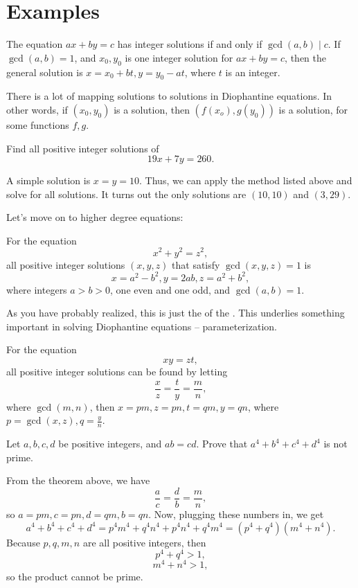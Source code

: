 \documentclass[mast]{lucky}
\begin{document}
\section{Examples}
\begin{theo} 
The equation $ax+by=c$ has integer solutions if and only if $\gcd(a,b) \mid c$. If $\gcd(a,b) = 1$, and $x_0,y_0$ is one integer solution for $ax+by=c$, then the general solution is $x=x_0+bt,y=y_0-at$, where $t$ is an integer.
\end{theo}
There is a lot of mapping solutions to solutions in Diophantine equations. In other words, if $(x_0,y_0)$ is a solution, then $(f(x_o),g(y_0))$ is a solution, for some functions $f,g$.
\begin{exam}
Find all positive integer solutions of
$$19x+7y=260.$$
\end{exam}
\begin{sol}
A simple solution is $x=y=10$. Thus, we can apply the method listed above and solve for all solutions. It turns out the only solutions are $(10,10)$ and $(3,29)$. 
\end{sol}
Let's move on to higher degree equations:
\begin{theo} 
For the equation
$$x^2+y^2=z^2,$$
all positive integer solutions $(x,y,z)$ that satisfy $\gcd(x,y,z)=1$ is 
$$x=a^2-b^2,y=2ab,z=a^2+b^2,$$
where integers $a>b>0$, one even and one odd, and $\gcd(a,b)=1$.
\end{theo}
As you have probably realized, this is just the  of the . This underlies something important in solving Diophantine equations -- parameterization. 
\begin{theo} 
For the equation
$$xy=zt,$$
all positive integer solutions can be found by letting
$$\frac{x}{z} = \frac{t}{y} = \frac{m}{n},$$
where $\gcd(m,n)$, then $x=pm,z=pn,t=qm,y=qn$, where $p=\gcd(x,z),q=\frac{y}{n}$. 
\end{theo}
\begin{exam}
Let $a,b,c,d$ be positive integers, and $ab=cd$. Prove that $a^4+b^4+c^4+d^4$ is not prime.
\end{exam}
\begin{sol}
From the theorem above, we have
$$\frac{a}{c} = \frac{d}{b} = \frac{m}{n},$$
so $a=pm,c=pn,d=qm,b=qn$. Now, plugging these numbers in, we get
$$a^4+b^4+c^4+d^4 = p^4m^4 + q^4n^4 + p^4n^4 + q^4m^4 = (p^4 + q^4)(m^4+n^4).$$
Because $p,q,m,n$ are all positive integers, then 
$$p^4+q^4>1,$$
$$m^4+n^4>1,$$
so the product cannot be prime.
\end{sol}
\end{document}
